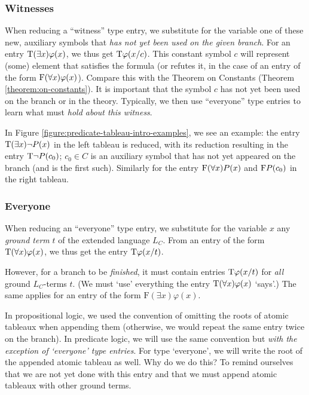\subsubsection{Witnesses}
When reducing a ``witness'' type entry, we substitute for the variable one of these new, auxiliary symbols that \emph{has not yet been used on the given branch}. For an entry $\mathrm{T}(\exists x)\varphi(x)$, we thus get $\mathrm{T}\varphi(x/c)$. This constant symbol $c$ will represent (some) element that satisfies the formula (or refutes it, in the case of an entry of the form $\mathrm{F}(\forall x)\varphi(x)$). Compare this with the Theorem on Constants (Theorem \ref{theorem:on-constants}). It is important that the symbol $c$ has not yet been used on the branch or in the theory. Typically, we then use ``everyone'' type entries to learn what must \emph{hold about this witness}.

In Figure \ref{figure:predicate-tableau-intro-examples}, we see an example: the entry $\mathrm{T}(\exists x)\neg P(x)$ in the left tableau is reduced, with its reduction resulting in the entry $\mathrm{T}\neg P(c_0)$; $c_0\in C$ is an auxiliary symbol that has not yet appeared on the branch (and is the first such). Similarly for the entry $\mathrm{F}(\forall x)P(x)$ and $\mathrm{F} P(c_0)$ in the right tableau.

\subsubsection{Everyone}
When reducing an ``everyone'' type entry, we substitute for the variable $x$ any \emph{ground term} $t$ of the extended language $L_C$. From an entry of the form $\mathrm{T}(\forall x)\varphi(x)$, we thus get the entry $\mathrm{T}\varphi(x/t)$.

However, for a branch to be \emph{finished}, it must contain entries $\mathrm{T}\varphi(x/t)$ for \emph{all} ground $L_C$-terms $t$. (We must `use' everything the entry $\mathrm{T}(\forall x)\varphi(x)$ `says'.) The same applies for an entry of the form $\mathrm{F}(\exists x)\varphi(x)$.

In propositional logic, we used the convention of omitting the roots of atomic tableaux when appending them (otherwise, we would repeat the same entry twice on the branch). In predicate logic, we will use the same convention but \emph{with the exception of `everyone' type entries}. For type `everyone', we will write the root of the appended atomic tableau as well. Why do we do this? To remind ourselves that we are not yet done with this entry and that we must append atomic tableaux with other ground terms.

